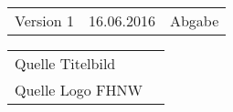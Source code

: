 \begin{tiny}
    \begin{tabular}{>{\ttfamily}lrl}
        Version 1 & 16.06.2016 & Abgabe \\
    \end{tabular}

    \vspace{1em}
    \begin{tabular}{l @{${}:{}$} l}
        Quelle Titelbild & \cite{ref:titlepage:pvanlage} \\
        Quelle Logo FHNW & \cite{ref:fhnwlogo}           \\
    \end{tabular}
\end{tiny}
